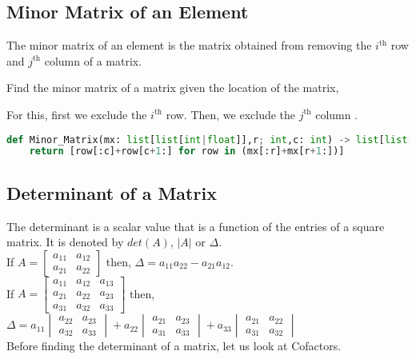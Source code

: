 \subsection{Minor Matrix of an Element}
The minor matrix of an element is the matrix obtained from removing the $i^{\text{th}}$ row and $j^{\text{th}}$ column of a matrix.\
\begin{eg}
	Find the minor matrix of a matrix given the location of the matrix,
\end{eg}
\begin{explanation}
	For this, first we exclude the $i^{\text{th}}$ row. Then, we exclude the $j^{\text{th}}$ column .
	\begin{lstlisting}[language=Python, numbers=none]
def Minor_Matrix(mx: list[list[int|float]],r; int,c: int) -> list[list[int|float]]:
    return [row[:c]+row[c+1:] for row in (mx[:r]+mx[r+1:])] \end{lstlisting}
\end{explanation}
\subsection{Determinant of a Matrix}
The determinant is a scalar value that is a function of the entries of a square matrix. It is denoted by $det(A)$, $|A|$ or $\Delta$.\\
If $A=\begin{bmatrix}
		a_{11} & a_{12} \\
		a_{21} & a_{22}
	\end{bmatrix}$ then, $\Delta =a_{11}a_{22}-a_{21}a_{12}$.\\
If $A=\begin{bmatrix}
		a_{11} & a_{12} & a_{13} \\
		a_{21} & a_{22} & a_{23} \\
		a_{31} & a_{32} & a_{33}
	\end{bmatrix}$ then, $\Delta=a_{11}\begin{vmatrix}
		a_{22} & a_{23} \\
		a_{32} & a_{33}
	\end{vmatrix}+a_{22}\begin{vmatrix}
		a_{21} & a_{23} \\
		a_{31} & a_{33}
	\end{vmatrix}+a_{33}\begin{vmatrix}
		a_{21} & a_{22} \\
		a_{31} & a_{32}
	\end{vmatrix}$\\
Before finding the determinant of a matrix, let us look at Cofactors.
